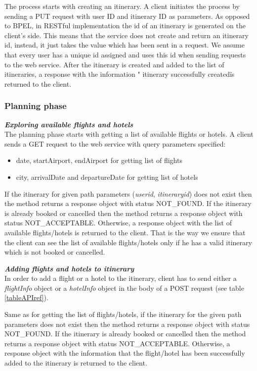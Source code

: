 The process starts with creating an itinerary. A client initiates the process by sending a PUT request with user ID and itinerary ID as parameters. As opposed to BPEL, in RESTful implementation the id of an itinerary is generated on the client’s side. This means that the service does not create and return an itinerary id, instead, it just takes the value which has been sent in a request. We assume that every user has a unique id assigned and uses this id when sending requests to the web service. After the itinerary is created and added to the list of itineraries, a response with the information " itinerary successfully created\" is returned to the client. 

\subsubsection*{Planning phase}
\textbf{\textit{Exploring available flights and hotels}}\\
The planning phase starts with getting a list of available flights or hotels. A client sends a GET request to the web service with query parameters specified:

\begin{itemize}
\item date, startAirport, endAirport for getting list of flights
\item city, arrivalDate and departureDate for getting list of hotels
\end{itemize}

If the itinerary for given path parameters (\textit{userid}, \textit{itineraryid}) does not exist then the method returns a response object with status NOT\_FOUND. If the itinerary is already booked or cancelled then the method returns a response object with status NOT\_ACCEPTABLE. Otherwise, a response object with the list of available flights/hotels is returned to the client. That is the way we ensure that the client can see the list of available flights/hotels only if he has a valid itinerary which is not booked or cancelled.

\textbf{\textit{Adding flights and hotels to itinerary}}\\
In order to add a flight or a hotel to the itinerary, client has to send either a \textit{flightInfo} object or a \textit{hotelInfo} object in the body of a POST request (see table \ref{tableAPIref}). 

Same as for getting the list of flights/hotels, if the itinerary for the given path parameters does not exist then the method returns a response object with status NOT\_FOUND. If the itinerary is already booked or cancelled then the method returns a response object with status NOT\_ACCEPTABLE. Otherwise, a response object with the information that the flight/hotel has been successfully added to the itinerary is returned to the client.

